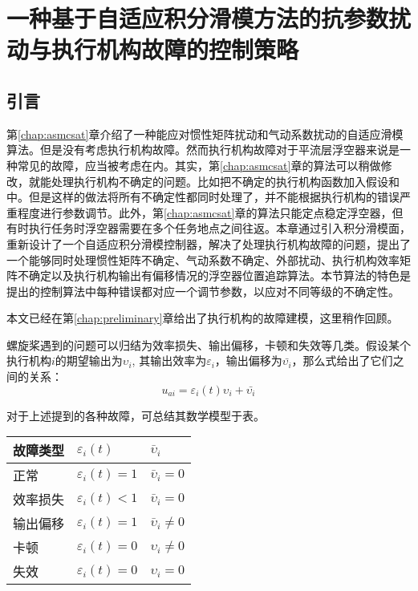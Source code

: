 
\chapter{一种基于自适应积分滑模方法的抗参数扰动与执行机构故障的控制策略}
\label{chap:aismc}
\section{引言}
第\ref{chap:asmcsat}章介绍了一种能应对惯性矩阵扰动和气动系数扰动的自适应滑模算法。但是没有考虑执行机构故障。然而执行机构故障对于平流层浮空器来说是一种常见的故障，应当被考虑在内。其实，第\ref{chap:asmcsat}章的算法可以稍做修改，就能处理执行机构不确定的问题。比如把不确定的执行机构函数加入假设和中。但是这样的做法将所有不确定性都同时处理了，并不能根据执行机构的错误严重程度进行参数调节。此外，第\ref{chap:asmcsat}章的算法只能定点稳定浮空器，但有时执行任务时浮空器需要在多个任务地点之间往返。本章通过引入积分滑模面，重新设计了一个自适应积分滑模控制器，解决了处理执行机构故障的问题，提出了一个能够同时处理惯性矩阵不确定、气动系数不确定、外部扰动、执行机构效率矩阵不确定以及执行机构输出有偏移情况的浮空器位置追踪算法。本节算法的特色是提出的控制算法中每种错误都对应一个调节参数，以应对不同等级的不确定性。

本文已经在第\ref{chap:preliminary}章给出了执行机构的故障建模，这里稍作回顾。

螺旋桨遇到的问题可以归结为效率损失、输出偏移，卡顿和失效等几类。假设某个执行机构$i$的期望输出为$\upsilon_i$, 其输出效率为$\varepsilon_i$，输出偏移为$\bar{\upsilon_i}$，那么式给出了它们之间的关系：
\begin{equation*}
    u_{ai} = \varepsilon_i(t)\upsilon_i+\bar{\upsilon_i}
\end{equation*}

对于上述提到的各种故障，可总结其数学模型于表。
\begin{table}[ht]
    \centering
	\vspace{0.5em}
	\begin{tabular}{lll}
		\toprule
		故障类型&$\varepsilon_i(t)$&$\bar{\upsilon}_i$ \\
		\midrule
		正常&$\varepsilon_i(t)=1$&$\bar{\upsilon}_i=0$\\
		效率损失&$\varepsilon_i(t)<1$&$\bar{\upsilon}_i=0$\\
		输出偏移&$\varepsilon_i(t)=1$&$\bar{\upsilon}_i\neq0$\\
		卡顿&$\varepsilon_i(t)=0$&$\upsilon_i\neq0$\\
		失效&$\varepsilon_i(t)=0$&$\upsilon_i=0$\\
		\bottomrule
	\end{tabular}
\end{table}

